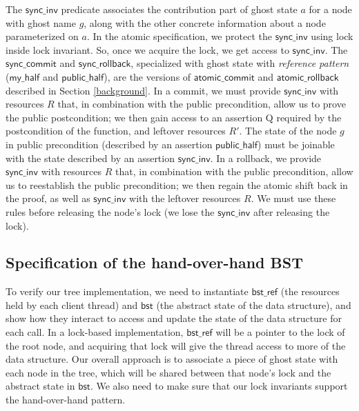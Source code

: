 \documentclass[acmsmall,screen]{acmart}\settopmatter{printfolios=true}
\newcommand{\treerep}{\ensuremath{\mathsf{bst}}}
\newcommand{\nodeboxrep}{\ensuremath{\mathsf{bst\_ref}}}
\begin{document}
The $\mathsf{sync\_inv}$ predicate associates the contribution part of ghost state $a$ for a node with ghost name $g$, along with the other concrete information about a node parameterized on $a$. In the atomic specification, we protect the $\mathsf{sync\_inv}$ using lock inside lock invariant. So, once we acquire the lock, we get access to $\mathsf{sync\_inv}$. The $\mathsf{sync\_commit}$ and $\mathsf{sync\_rollback}$, specialized with ghost state with \emph{reference pattern} ($\mathsf{my\_half}$ and $\mathsf{public\_half}$), are the versions of $\mathsf{atomic\_commit}$ and $\mathsf{atomic\_rollback}$ described in Section \ref{background}. In a commit, we must provide $\mathsf{sync\_inv}$ with resources $R$ that, in combination with the public precondition, allow us to prove the public postcondition; we then gain access to an assertion Q required by the postcondition of the function, and leftover resources $R'$. The state of the node $g$ in public precondition (described by an assertion $\mathsf{public\_half}$) must be joinable with the state described by an assertion $\mathsf{sync\_inv}$. In a rollback, we provide $\mathsf{sync\_inv}$ with resources $R$ that, in combination with the public precondition, allow us to reestablish the public precondition; we then regain the atomic shift back in the proof, as well as $\mathsf{sync\_inv}$ with the leftover resources $R$. We must use these rules before releasing the node's lock (we lose the $\mathsf{sync\_inv}$ after releasing the lock).  

\subsection{Specification of the hand-over-hand BST}

To verify our tree implementation, we need to instantiate $\nodeboxrep$ (the resources held by each client thread) and $\treerep$ (the abstract state of the data structure), and show how they interact to access and update the state of the data structure for each call. In a lock-based implementation, $\nodeboxrep$ will be a pointer to the lock of the root node, and acquiring that lock will give the thread access to more of the data structure. Our overall approach is to associate a piece of ghost state with each node in the tree, which will be shared between that node's lock and the abstract state in $\treerep$. We also need to make sure that our lock invariants support the hand-over-hand pattern.
\end{document}
